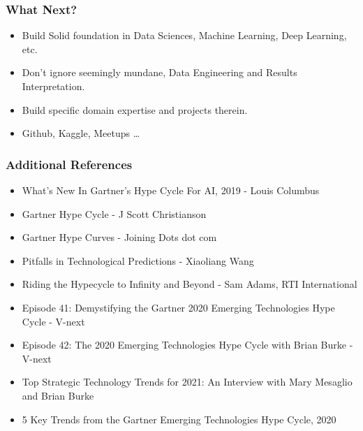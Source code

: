\begin{frame}[fragile]\frametitle{What Next?}


\begin{itemize}
\item Build Solid foundation in Data Sciences, Machine Learning, Deep Learning, etc.
\item Don't ignore seemingly mundane, Data Engineering and Results Interpretation.
\item Build specific domain expertise and projects therein.
\item Github, Kaggle, Meetups \ldots
\end{itemize}

\end{frame}


\begin{frame}[fragile]\frametitle{Additional References}


\begin{itemize}
\item What's New In Gartner's Hype Cycle For AI, 2019 - Louis Columbus
\item Gartner Hype Cycle - J Scott Christianson
\item Gartner Hype Curves - Joining Dots dot com
\item Pitfalls in Technological Predictions - Xiaoliang Wang
\item Riding the Hypecycle to Infinity and Beyond - Sam Adams, RTI International
\item Episode 41: Demystifying the Gartner 2020 Emerging Technologies Hype Cycle - V-next
\item Episode 42: The 2020 Emerging Technologies Hype Cycle with Brian Burke - V-next
\item Top Strategic Technology Trends for 2021: An Interview with Mary Mesaglio and Brian Burke
\item 5 Key Trends from the Gartner Emerging Technologies Hype Cycle, 2020
\end{itemize}

\end{frame}


